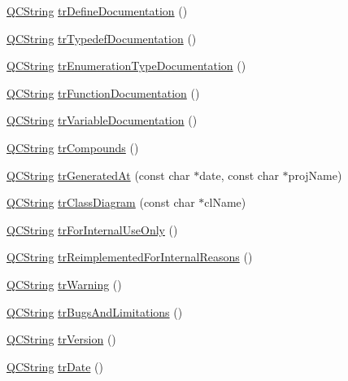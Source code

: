 \begin{DoxyCompactItemize}
\hyperlink{class_q_c_string}{Q\-C\-String} \hyperlink{class_translator_polish_aac6b7b23798753a3c86f20b55ef4e2e4}{tr\-Define\-Documentation} ()
\item 
\hyperlink{class_q_c_string}{Q\-C\-String} \hyperlink{class_translator_polish_a1611eb91129bc7fbac2586a1b913710d}{tr\-Typedef\-Documentation} ()
\item 
\hyperlink{class_q_c_string}{Q\-C\-String} \hyperlink{class_translator_polish_ae11f24a699bb6c1becaf521cdac12ab0}{tr\-Enumeration\-Type\-Documentation} ()
\item 
\hyperlink{class_q_c_string}{Q\-C\-String} \hyperlink{class_translator_polish_a54c0fb7e39b052558da3844673b26e1e}{tr\-Function\-Documentation} ()
\item 
\hyperlink{class_q_c_string}{Q\-C\-String} \hyperlink{class_translator_polish_aeff3c7fbc21cb023b224c101b81210ed}{tr\-Variable\-Documentation} ()
\item 
\hyperlink{class_q_c_string}{Q\-C\-String} \hyperlink{class_translator_polish_ae2c887f8a9fe5663d722b798b02628e8}{tr\-Compounds} ()
\item 
\hyperlink{class_q_c_string}{Q\-C\-String} \hyperlink{class_translator_polish_a6675fccca4756f9c0d86797009a4ad7e}{tr\-Generated\-At} (const char $\ast$date, const char $\ast$proj\-Name)
\item 
\hyperlink{class_q_c_string}{Q\-C\-String} \hyperlink{class_translator_polish_a5dc8187057a8e4f4ca85ad94ade9e82c}{tr\-Class\-Diagram} (const char $\ast$cl\-Name)
\item 
\hyperlink{class_q_c_string}{Q\-C\-String} \hyperlink{class_translator_polish_ac4cc9aa408e288c1e2b037ec3b23c4f7}{tr\-For\-Internal\-Use\-Only} ()
\item 
\hyperlink{class_q_c_string}{Q\-C\-String} \hyperlink{class_translator_polish_ac78129c2f9658e26be5a28274d809a3f}{tr\-Reimplemented\-For\-Internal\-Reasons} ()
\item 
\hyperlink{class_q_c_string}{Q\-C\-String} \hyperlink{class_translator_polish_aae1caf252b911312ae9c13e4f478cea3}{tr\-Warning} ()
\item 
\hyperlink{class_q_c_string}{Q\-C\-String} \hyperlink{class_translator_polish_a82b52cc8fb9d5ef0332bbf5fe111c048}{tr\-Bugs\-And\-Limitations} ()
\item 
\hyperlink{class_q_c_string}{Q\-C\-String} \hyperlink{class_translator_polish_ae87e51832e87155cee39f9446452eea5}{tr\-Version} ()
\item 
\hyperlink{class_q_c_string}{Q\-C\-String} \hyperlink{class_translator_polish_a8a42054aac49264702e63d0048612a63}{tr\-Date} ()

\end{DoxyCompactItemize}
